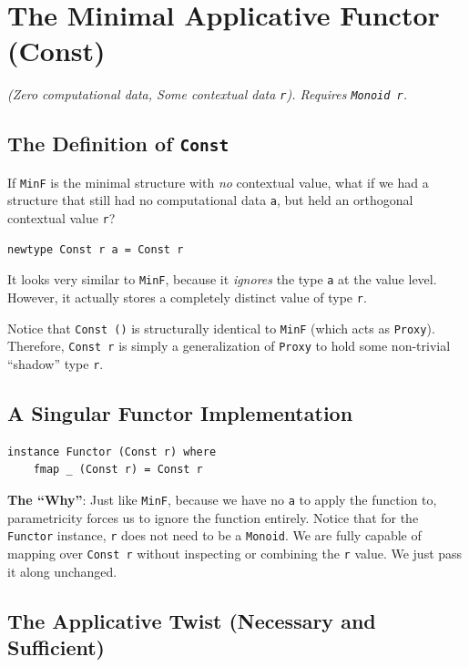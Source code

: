 \documentclass[12pt,a4paper]{article}
\begin{document}
\section{The Minimal Applicative Functor (Const)}

\textit{(Zero computational data, Some contextual data \texttt{r}). Requires \texttt{Monoid r}.}

\subsection{The Definition of \texttt{Const}}

If \texttt{MinF} is the minimal structure with \textit{no} contextual value, what if we had a structure that still had no computational data \texttt{a}, but held an orthogonal contextual value \texttt{r}?
\begin{lstlisting}
newtype Const r a = Const r
\end{lstlisting}
It looks very similar to \texttt{MinF}, because it \textit{ignores} the type \texttt{a} at the value level. However, it actually stores a completely distinct value of type \texttt{r}. 

Notice that \texttt{Const ()} is structurally identical to \texttt{MinF} (which acts as \texttt{Proxy}). Therefore, \texttt{Const r} is simply a generalization of \texttt{Proxy} to hold some non-trivial ``shadow'' type \texttt{r}.

\subsection{A Singular Functor Implementation}

\begin{lstlisting}
instance Functor (Const r) where
    fmap _ (Const r) = Const r
\end{lstlisting}
\textbf{The ``Why''}: Just like \texttt{MinF}, because we have no \texttt{a} to apply the function to, parametricity forces us to ignore the function entirely. Notice that for the \texttt{Functor} instance, \texttt{r} does not need to be a \texttt{Monoid}. We are fully capable of mapping over \texttt{Const r} without inspecting or combining the \texttt{r} value. We just pass it along unchanged.

\subsection{The Applicative Twist (Necessary and Sufficient)}
\end{document}
